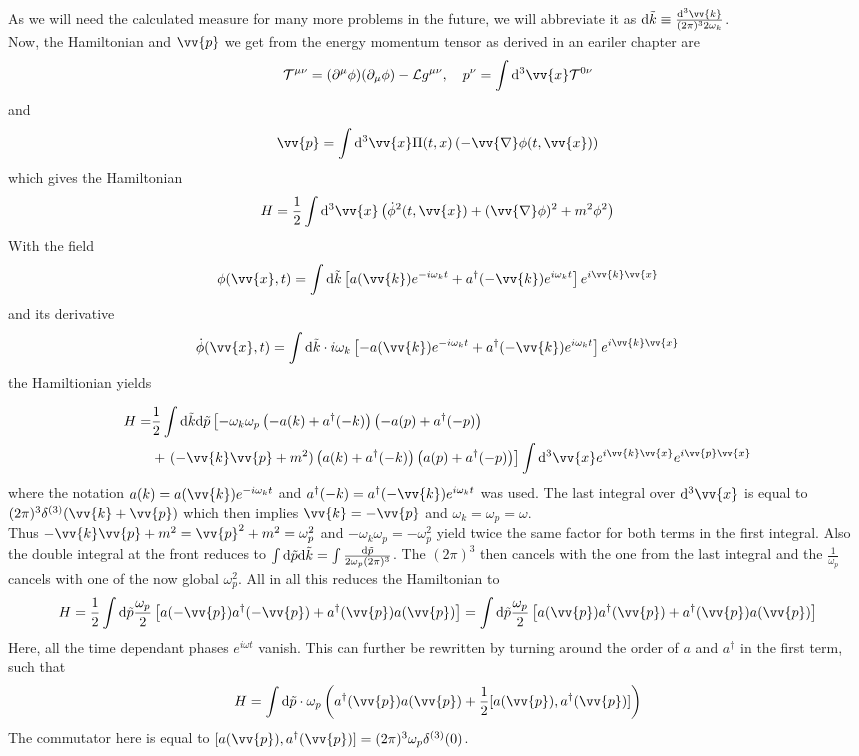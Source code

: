 \documentclass{include/thesisclass}
\newcommand{\LL}{\mathcal{L}}
\newcommand{\cc}{\cdot}
\newcommand{\vx}{\vv{x}}
\newcommand{\vp}{\vv{p}}
\newcommand{\dd}{{\rm d}}
\newcommand{\p}{\partial}
\newcommand{\vn}{\vv{\nabla}}
\begin{document}
As we will need the calculated measure for many more problems in the future, we will abbreviate it as $\dd \tilde{k} \equiv \frac{\dd^3 \vv{k}}{(2\pi)^3 2 \omega_k}$.\\
Now, the Hamiltonian and $\vp$ we get from the energy momentum tensor as derived in an eariler chapter are
\[ \mathcal{T}^{\mu\nu} = ( \p^\mu \phi)(\p_\mu \phi) - \LL g^{\mu\nu}, ~~~p^\nu = \int \dd^3 \vx \mathcal{T}^{0\nu}\]
and
\[ \vp = \int \dd^3 \vx \Pi(t,x)\left(-\vn \phi(t,\vx)\right)\]
which gives the Hamiltonian
\[ H = \frac{1}{2} \int \dd^3 \vx \left( \dot{\phi}^2(t,\vx) + ( \vn \phi)^2 + m^2 \phi^2\right)\]
With the field
\[ \phi(\vx, t) = \int \dd \tilde{k} \left[ a (\vv{k}) e^{-i \omega_k t} + a^\dagger(-\vv{k}) e^{i \omega_k t} \right] e^{i \vv{k}\vx}\]
and its derivative
\[ \dot{\phi}(\vx, t) = \int \dd \tilde{k}\cc i \omega_k \left[ -a(\vv{k}) e^{-i \omega_k t} + a^\dagger (-\vv{k}) e^{i \omega_k t} \right] e^{i \vv{k}\vx}\]
the Hamiltionian yields

\begin{align*}
H =& \frac{1}{2} \int \dd \tilde{k} \dd \tilde{p} \left[ - \omega_k \omega_p \left( - a(k) + a^\dagger(-k) \right)\left( -a(p) + a^\dagger(-p)\right) \right. \\
&+ \left. ( - \vv{k} \vp + m^2) \left( a(k) + a^\dagger(-k) \right) \left( a(p) + a^\dagger(-p)\right)\right] \int \dd^3 \vx e^{i \vv{k} \vx}e^{i \vp \vx}
\end{align*}
where the notation $a(k) = a(\vv{k})e^{-i\omega_kt}$ and $a^\dagger(-k) = a^\dagger(-\vv{k})e^{i\omega_kt}$ was used. The last integral over $\dd^3 \vx$ is equal to $(2\pi)^3 \delta^{(3)}(\vv{k} + \vp)$ which then implies $\vv{k} = - \vp$ and $\omega_k = \omega_p = \omega$.\\
Thus $-\vv{k}\vp + m^2 =  \vp^2 + m^2 = \omega_p^2$ and $-\omega_k \omega_p = -\omega_p^2$ yield twice the same factor for both terms in the first integral. Also the double integral at the front reduces to $\int \dd\tilde{p}\dd\tilde{k} = \int \frac{\dd\tilde{p}}{2 \omega_p (2\pi)^3}$. The $(2\pi)^3$ then cancels with the one from the last integral and the $\frac{1}{\omega_p}$ cancels with one of the now global $\omega_p^2$. All in all this reduces the Hamiltonian to
\[H = \frac{1}{2} \int \dd\tilde{p} \frac{\omega_p}{2} \left[ a(-\vp)a^\dagger(-\vp) + a^\dagger(\vp)a(\vp)\right] = \int \dd \tilde{p} \frac{\omega_p}{2} \left[a(\vp) a^\dagger(\vp) + a^\dagger(\vp) a(\vp) \right]\]
Here, all the time dependant phases $e^{i\omega t}$ vanish. This can further be rewritten by turning around the order of $a$ and $a^\dagger$ in the first term, such that
\[H = \int \dd \tilde{p} \cc\omega_p \left( a^\dagger(\vp) a(\vp) + \frac{1}{2}[ a(\vp), a^\dagger(\vp) ] \right)\]
The commutator here is equal to $[a(\vp), a^\dagger(\vp)] = (2\pi)^3 \omega_p \delta^{(3)}(0)$.
\end{document}

